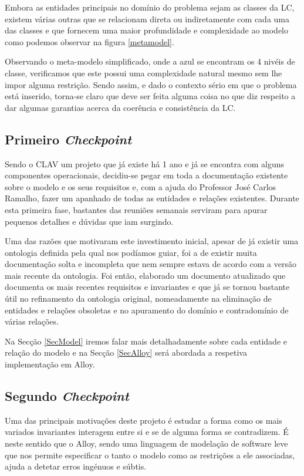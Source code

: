 \documentclass[runningheads,a4paper]{llncs}
\begin{document}
Embora as entidades principais no domínio do problema sejam as classes da LC, existem várias outras que se relacionam direta ou indiretamente com cada uma das classes e que fornecem uma maior profundidade e complexidade ao modelo como podemos observar na figura \ref{metamodel}.

Observando o meta-modelo simplificado, onde a azul se encontram os 4 nivéis de classe, verificamos que este possui uma complexidade natural mesmo sem lhe impor alguma restrição. Sendo assim, e dado o contexto sério em que o problema está inserido, torna-se claro que deve ser feita alguma coisa no que diz respeito a dar algumas garantias acerca da coerência e consistência da LC.

\subsection{Primeiro \textit{Checkpoint}}

Sendo o CLAV um projeto que já existe há 1 ano e já se encontra com alguns componentes operacionais, decidiu-se pegar em toda a documentação existente sobre o modelo e os seus requisitos e, com a ajuda do Professor José Carlos Ramalho, fazer um apanhado de todas as entidades e relações existentes. Durante esta primeira fase, bastantes das reuniões semanais serviram para apurar pequenos detalhes e dúvidas que iam surgindo.

Uma das razões que motivaram este investimento inicial, apesar de já existir uma ontologia definida pela qual nos podíamos guiar, foi a de existir muita documentação\cite{clav-new}\cite{clav-mod}\cite{clav-req} solta e incompleta que nem sempre estava de acordo com a versão mais recente da ontologia. Foi então, elaborado um documento atualizado que documenta os mais recentes requisitos e invariantes e que já se tornou bastante útil no refinamento da ontologia original, nomeadamente na eliminação de entidades e relações obsoletas e no apuramento do domínio e contradomínio de várias relações.

Na Secção \ref{SecModel} iremos falar mais detalhadamente sobre cada entidade e relação do modelo e na Secção \ref{SecAlloy} será abordada a respetiva implementação em Alloy.

\subsection{Segundo \textit{Checkpoint}}

Uma das principais motivações deste projeto é estudar a forma como os mais variados invariantes interagem entre si e se de alguma forma se contradizem. É neste sentido que o Alloy, sendo uma linguagem de modelação de software leve que nos permite especificar o tanto o modelo como as restrições a ele associadas, ajuda a detetar erros ingénuos e súbtis.
\end{document}
